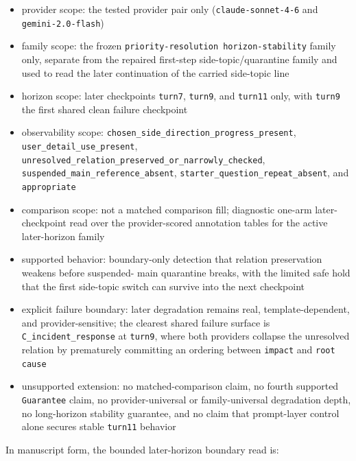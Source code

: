 \documentclass[11pt]{article}
\begin{document}
\begin{itemize}
\item provider scope:
  the tested provider pair only (\texttt{claude-sonnet-4-6} and
  \texttt{gemini-2.0-flash})
\item family scope:
  the frozen \texttt{priority-resolution horizon-stability} family only,
  separate from the repaired first-step side-topic/quarantine family and used
  to read the later continuation of the carried side-topic line
\item horizon scope:
  later checkpoints \texttt{turn7}, \texttt{turn9}, and \texttt{turn11} only,
  with \texttt{turn9} the first shared clean failure checkpoint
\item observability scope:
  \texttt{chosen\_side\_direction\_progress\_present},
  \texttt{user\_detail\_use\_present},
  \texttt{unresolved\_relation\_preserved\_or\_narrowly\_checked},
  \texttt{suspended\_main\_reference\_absent},
  \texttt{starter\_question\_repeat\_absent}, and \texttt{appropriate}
\item comparison scope:
  not a matched comparison fill; diagnostic one-arm later-checkpoint read over
  the provider-scored annotation tables for the active later-horizon family
\item supported behavior:
  boundary-only detection that relation preservation weakens before suspended-
  main quarantine breaks, with the limited safe hold that the first side-topic
  switch can survive into the next checkpoint
\item explicit failure boundary:
  later degradation remains real, template-dependent, and provider-sensitive;
  the clearest shared failure surface is \texttt{C\_incident\_response} at
  \texttt{turn9}, where both providers collapse the unresolved relation by
  prematurely committing an ordering between \texttt{impact} and
  \texttt{root cause}
\item unsupported extension:
  no matched-comparison claim, no fourth supported \texttt{Guarantee} claim,
  no provider-universal or family-universal degradation depth, no long-horizon
  stability guarantee, and no claim that prompt-layer control alone secures
  stable \texttt{turn11} behavior
\end{itemize}

In manuscript form, the bounded later-horizon boundary read is:
\end{document}
